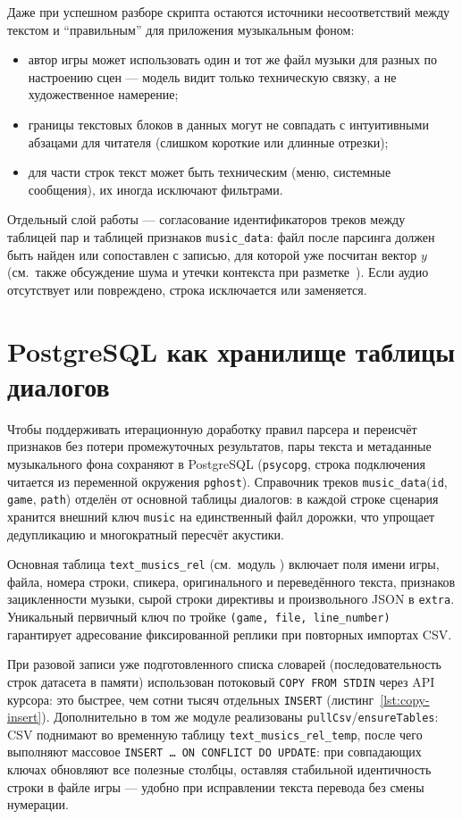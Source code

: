 Даже при успешном разборе скрипта остаются источники несоответствий между текстом и ``правильным'' для приложения музыкальным фоном:

\begin{itemize}
	\item автор игры может использовать один и тот же файл музыки для разных по настроению сцен --- модель видит только техническую связку, а не художественное намерение;
	\item границы текстовых блоков в данных могут не совпадать с интуитивными абзацами для читателя (слишком короткие или длинные отрезки);
	\item для части строк текст может быть техническим (меню, системные сообщения), их иногда исключают фильтрами.
\end{itemize}

Отдельный слой работы --- согласование идентификаторов треков между таблицей пар и таблицей признаков \texttt{music\_data}: файл после парсинга должен быть найден или сопоставлен с записью, для которой уже посчитан вектор $y$ (см.\ также обсуждение шума и утечки контекста при разметке~\cite{nikolenko2018}). Если аудио отсутствует или повреждено, строка исключается или заменяется.

\section{PostgreSQL как хранилище таблицы диалогов}

Чтобы поддерживать итерационную доработку правил парсера и переисчёт признаков без потери промежуточных результатов, пары текста и метаданные музыкального фона сохраняют в PostgreSQL (\texttt{psycopg}, строка подключения читается из переменной окружения \texttt{pghost}). Справочник треков \texttt{music\_data}(\texttt{id}, \texttt{game}, \texttt{path}) отделён от основной таблицы диалогов: в каждой строке сценария хранится внешний ключ \texttt{music} на единственный файл дорожки, что упрощает дедупликацию и многократный пересчёт акустики.

Основная таблица \texttt{text\_musics\_rel} (см.\ модуль ) включает поля имени игры, файла, номера строки, спикера, оригинального и переведённого текста, признаков зацикленности музыки, сырой строки директивы и произвольного JSON в \texttt{extra}. Уникальный первичный ключ по тройке \texttt{(game, file, line\_number)} гарантирует адресование фиксированной реплики при повторных импортах CSV.

При разовой записи уже подготовленного списка словарей (последовательность строк датасета в памяти) использован потоковый \texttt{COPY FROM STDIN} через API курсора: это быстрее, чем сотни тысяч отдельных \texttt{INSERT} (листинг~\ref{lst:copy-insert}). Дополнительно в том же модуле реализованы \texttt{pullCsv}/\texttt{ensureTables}: CSV поднимают во временную таблицу \texttt{text\_musics\_rel\_temp}, после чего выполняют массовое \texttt{INSERT \ldots{} ON CONFLICT DO UPDATE}: при совпадающих ключах обновляют все полезные столбцы, оставляя стабильной идентичность строки в файле игры --- удобно при исправлении текста перевода без смены нумерации.

